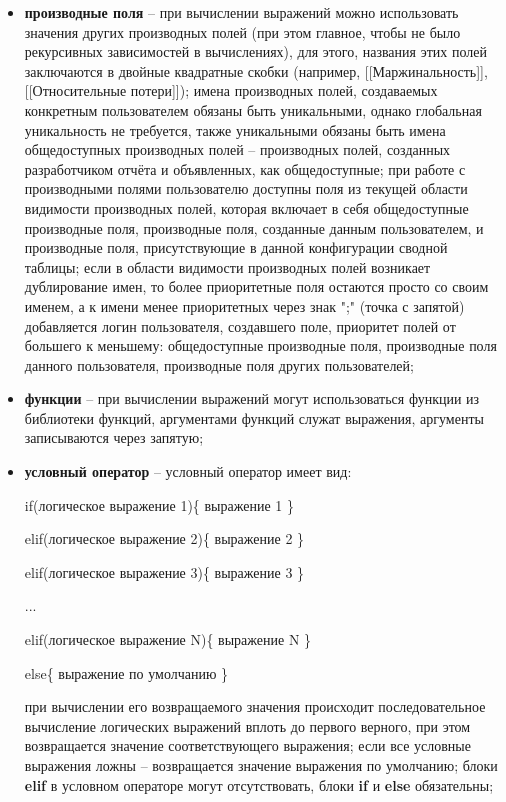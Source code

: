 \documentclass[../user-manual.tex]{subfiles}
\begin{document}
\begin{itemize}
		\item \textbf{производные поля} -- при вычислении выражений можно использовать значения других производных полей (при этом главное, чтобы не было рекурсивных зависимостей в вычислениях), для этого, названия этих полей заключаются в двойные квадратные скобки (например, [[Маржинальность]], [[Относительные потери]]); имена производных полей, создаваемых конкретным пользователем обязаны быть уникальными, однако глобальная уникальность не требуется, также уникальными обязаны быть имена общедоступных производных полей -- производных полей, созданных разработчиком отчёта и объявленных, как общедоступные; при работе с производными полями пользователю доступны поля из текущей области видимости производных полей, которая включает в себя общедоступные производные поля, производные поля, созданные данным пользователем, и производные поля, присутствующие в данной конфигурации сводной таблицы; если в области видимости производных полей возникает дублирование имен, то более приоритетные поля остаются просто со своим именем, а к имени менее приоритетных через знак ";" (точка с запятой) добавляется логин пользователя, создавшего поле, приоритет полей от большего к меньшему: общедоступные производные поля, производные поля данного пользователя, производные поля других пользователей;
		
		\item \textbf{функции} -- при вычислении выражений могут использоваться функции из библиотеки функций, аргументами функций служат выражения, аргументы записываются через запятую;
		
		\item \textbf{условный оператор} -- условный оператор имеет вид:
		
		if(логическое выражение 1)\{
			выражение 1
		\}
		
		elif(логическое выражение 2)\{
			выражение 2
		\}
		
		elif(логическое выражение 3)\{
			выражение 3   
		\}
		
		...
		
		elif(логическое выражение N)\{
			выражение N
		\}
	
		else\{
			выражение по умолчанию
		\}
		
		при вычислении его возвращаемого значения происходит последовательное вычисление логических выражений вплоть до первого верного, при этом возвращается значение соответствующего выражения; если все условные выражения ложны -- возвращается значение выражения по умолчанию; блоки \textbf{elif} в условном операторе могут отсутствовать, блоки \textbf{if} и \textbf{else} обязательны;
		

\end{itemize}
\end{document}
